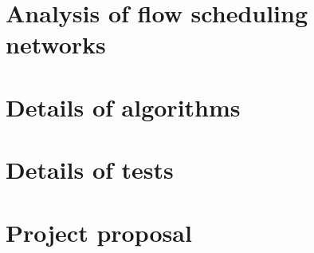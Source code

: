 \documentclass[12pt,a4paper,twoside,notitlepage]{report}
\theoremstyle{plain}
\theoremstyle{definition}
\theoremstyle{remark}
\begin{document}
\chapter{Analysis of flow scheduling networks} \label{appendix:flow-scheduling}


\chapter{Details of algorithms} \label{appendix:impl}


\chapter{Details of tests} \label{appendix:test}


\chapter{Project proposal} \label{appendix:proposal}

\end{document}
